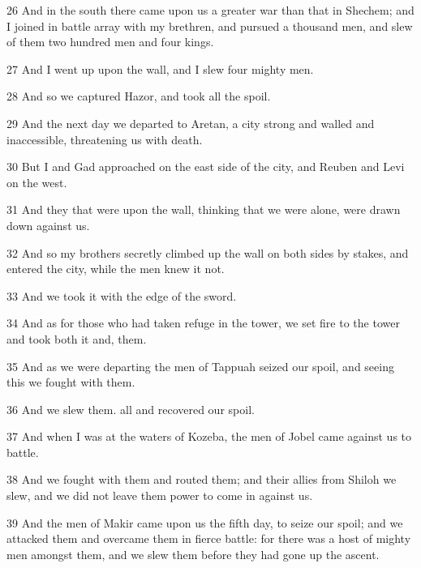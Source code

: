\par 26 And in the south there came upon us a greater war than that in Shechem; and I joined in battle array with my brethren, and pursued a thousand men, and slew of them two hundred men and four kings.

\par 27 And I went up upon the wall, and I slew four mighty men.

\par 28 And so we captured Hazor, and took all the spoil.

\par 29 And the next day we departed to Aretan, a city strong and walled and inaccessible, threatening us with death.

\par 30 But I and Gad approached on the east side of the city, and Reuben and Levi on the west.

\par 31 And they that were upon the wall, thinking that we were alone, were drawn down against us.

\par 32 And so my brothers secretly climbed up the wall on both sides by stakes, and entered the city, while the men knew it not.

\par 33 And we took it with the edge of the sword.

\par 34 And as for those who had taken refuge in the tower, we set fire to the tower and took both it and, them.

\par 35 And as we were departing the men of Tappuah seized our spoil, and seeing this we fought with them.

\par 36 And we slew them. all and recovered our spoil.

\par 37 And when I was at the waters of Kozeba, the men of Jobel came against us to battle.

\par 38 And we fought with them and routed them; and their allies from Shiloh we slew, and we did not leave them power to come in against us.

\par 39 And the men of Makir came upon us the fifth day, to seize our spoil; and we attacked them and overcame them in fierce battle: for there was a host of mighty men amongst them, and we slew them before they had gone up the ascent.

